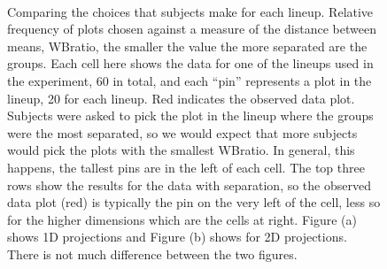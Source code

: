 \begin{figure}[htbp]
\centering
\mbox{\quad
{}}
\caption{Comparing the choices that subjects make for each lineup. Relative frequency of plots chosen against a measure of the distance between means, WBratio, the smaller the value the more separated are the groups. Each cell here shows the data for one of the lineups used in the experiment, 60 in total, and each ``pin'' represents a plot in the lineup, 20 for each lineup. Red indicates the observed data plot. Subjects were asked to pick the plot in the lineup where the groups were the most separated, so we would expect that more subjects would pick the plots with the smallest WBratio. In general, this happens, the tallest pins are in the left of each cell. The top three rows show the results for the data with separation, so the observed data plot (red) is typically the pin on the very left of the cell, less so for the higher dimensions which are the cells at right. Figure (a) shows 1D projections and Figure (b) shows for 2D projections. There is not much difference between the two figures. } 
\label{wbratio}
\end{figure}


